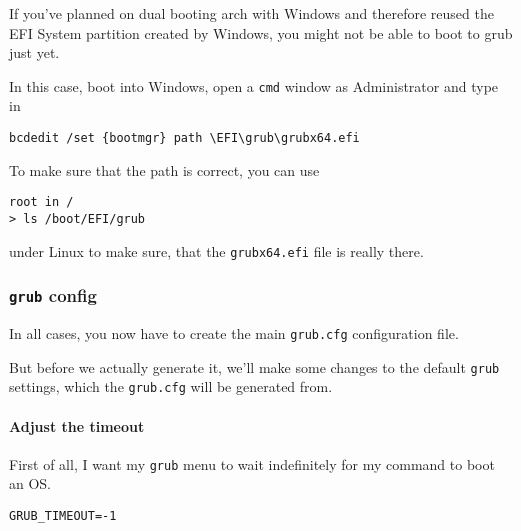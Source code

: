 \documentclass[10pt]{dustdoc}
\begin{document}
\begin{IMPORTANT}
    If you’ve planned on dual booting arch with Windows and therefore reused the EFI System partition created by Windows, you might not be able to boot to grub just yet.

    In this case, boot into Windows, open a \texttt{cmd} window as Administrator and type in

    \begin{verbatim}
bcdedit /set {bootmgr} path \EFI\grub\grubx64.efi
    \end{verbatim}

    To make sure that the path is correct, you can use

    \begin{verbatim}
root in /
> ls /boot/EFI/grub
    \end{verbatim}

    \noindent
    under Linux to make sure, that the \texttt{grubx64.efi} file is really there.
\end{IMPORTANT}

\subsubsection{\texttt{grub} config}%
\label{sec:grub-config}

In all cases, you now have to create the main \texttt{grub.cfg} configuration file.

But before we actually generate it, we’ll make some changes to the default \texttt{grub} settings, which the \texttt{grub.cfg} will be generated from.

\paragraph{Adjust the timeout}%
\label{par:adjust-the-timeout}

First of all, I want my \texttt{grub} menu to wait indefinitely for my command to boot an OS.\@

\begin{mintedlisting}
    \begin{verbatim}
GRUB_TIMEOUT=-1
    \end{verbatim}

    \caption{\texttt{/etc/default/grub}}
\end{mintedlisting}
\end{document}
